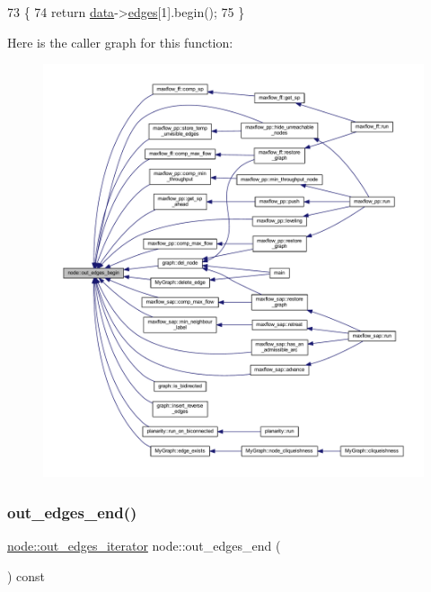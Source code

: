 \begin{DoxyCode}
73 \{
74     \textcolor{keywordflow}{return} \mbox{\hyperlink{classnode_a4ae3d54ebb61be3a102bedf5b91bef75}{data}}->\mbox{\hyperlink{classnode__data_a91690d6d2594423c2cdf8ea083c8bd75}{edges}}[1].begin();
75 \}
\end{DoxyCode}
Here is the caller graph for this function\+:\nopagebreak
\begin{figure}[H]
\begin{center}
\leavevmode
\includegraphics[width=350pt]{classnode_a7dcb80df22118cea04f77ca8c952d9c2_icgraph}
\end{center}
\end{figure}
\mbox{\label{classnode_a7ce2ba5195a63d4df6b44299a02a9378}} 
\subsubsection{\texorpdfstring{out\+\_\+edges\+\_\+end()}{out\_edges\_end()}}
{\footnotesize\ttfamily \mbox{\hyperlink{classnode_a90e17ed34de55072e8077f4367499a98}{node\+::out\+\_\+edges\+\_\+iterator}} node\+::out\+\_\+edges\+\_\+end (\begin{DoxyParamCaption}{ }\end{DoxyParamCaption}) const}

